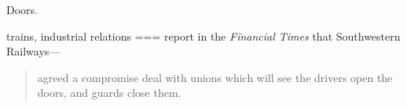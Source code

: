 Doors.

trains, industrial relations
===
\textcite{georgiadis2025} report in the \emph{Financial Times} that Southwestern Railways---
\begin{quote}
agreed a compromise deal with unions which will see the drivers open the doors, and guards close them.
\end{quote}
